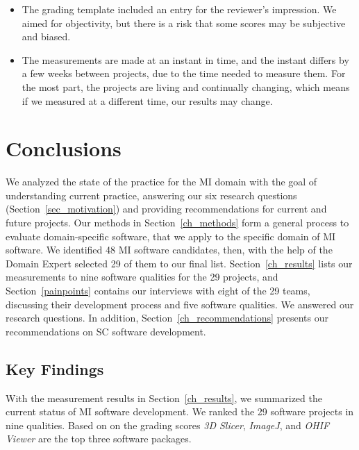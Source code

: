\documentclass[final, 3p, times, authoryear]{elsarticle}
\begin{document}
\begin{itemize}
\item The grading template included an entry for the reviewer's impression.  We
aimed for objectivity, but there is a risk that some scores may be subjective
and biased.
\item The measurements are made at an instant in time, and the instant differs
by a few weeks between projects, due to the time needed to measure them. For the
most part, the projects are living and continually changing, which means if we
measured at a different time, our results may change.
\end{itemize}

\section{Conclusions} \label{ch_conclusions}

We analyzed the state of the practice for the MI domain with the goal of
understanding current practice, answering our six research questions
(Section~\ref{sec_motivation}) and providing recommendations for current and
future projects.  Our methods in Section~\ref{ch_methods} form a general process
to evaluate domain-specific software, that we apply to the specific domain of MI
software. We identified 48 MI software candidates, then, with the help of the
Domain Expert selected 29 of them to our final list. Section~\ref{ch_results}
lists our measurements to nine software qualities for the 29 projects, and
Section~\ref{painpoints} contains our interviews with eight of the 29 teams,
discussing their development process and five software qualities.  We answered
our research questions. In addition, Section~\ref{ch_recommendations} presents
our recommendations on SC software development.

\subsection{Key Findings}

With the measurement results in Section~\ref{ch_results}, we summarized the
current status of MI software development. We ranked the 29 software projects in
nine qualities.  Based on on the grading scores \textit{3D Slicer},
\textit{ImageJ}, and \textit{OHIF Viewer} are the top three software packages.
\end{document}
